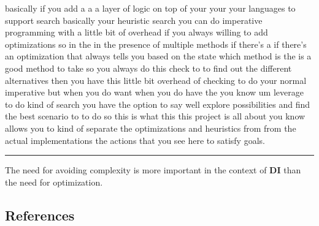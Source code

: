 basically if you add a a a layer of logic on top of your your your
languages to support search basically your heuristic search you can do
imperative programming with a little bit of overhead if you always
willing to add optimizations so in the in the presence of multiple
methods if there's a if there's an optimization that always tells you
based on the state which method is the is a good method to take so you
always do this check to to find out the different alternatives then you
have this little bit overhead of checking to do your normal imperative
but when you do want when you do have the you know um leverage to do
kind of search you have the option to say well explore possibilities and
find the best scenario to to do so this is what this this project is all
about you know allows you to kind of separate the optimizations and
heuristics from from the actual implementations the actions that you see
here to satisfy goals.

\begin{center}\rule{0.5\linewidth}{0.5pt}\end{center}

The need for avoiding complexity is more important in the context of
\textbf{DI} than the need for optimization.

\hypertarget{references}{%
\subsection*{References}\label{references}}

